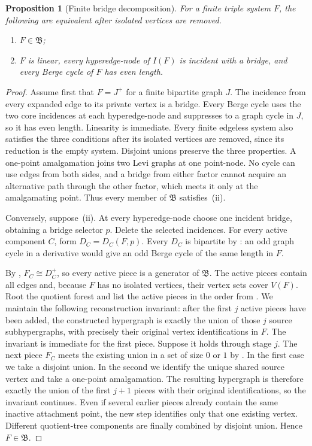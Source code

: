 \documentclass[11pt]{amsart}
\newtheorem{proposition}[proposition]{Proposition}
\theoremstyle{definition}
\theoremstyle{remark}
\numberwithin{equation}{section}
\newcommand{\Bclass}{\mathfrak B}
\begin{document}
\begin{proposition}[Finite bridge decomposition]
\label{prop:finite-decomposition}
For a finite triple system $F$, the following are equivalent after
isolated vertices are removed.
\begin{enumerate}[label=\textup{(\roman*)}]
\item $F\in\Bclass$;
\item $F$ is linear, every hyperedge-node of $I(F)$ is incident with a
bridge, and every Berge cycle of $F$ has even length.
\end{enumerate}
\end{proposition}

\begin{proof}
Assume first that $F=J^+$ for a finite bipartite graph $J$.  The
incidence from every expanded edge to its private vertex is a bridge.
Every Berge cycle uses the two core incidences at each hyperedge-node and
suppresses to a graph cycle in $J$, so it has even length.  Linearity is
immediate.  Every finite edgeless system also satisfies the three
conditions after its isolated vertices are removed, since its reduction
is the empty system.  Disjoint unions preserve the three properties.  A one-point
amalgamation joins two Levi graphs at one point-node.  No cycle can use
edges from both sides, and a bridge from either factor cannot acquire an
alternative path through the other factor, which meets it only at the
amalgamating point.  Thus every member of $\Bclass$ satisfies~\textup{(ii)}.

Conversely, suppose~\textup{(ii)}.  At every hyperedge-node choose one
incident bridge, obtaining a bridge selector $p$.  Delete the selected
incidences.  For every active component $C$, form
$D_C=D_C(F,p)$.  Every $D_C$ is bipartite by : an odd graph
cycle in a derivative would give an odd Berge cycle of the same length in
$F$.

By , $F_C\cong D_C^+$, so every active piece is
a generator of $\Bclass$.  The active pieces contain all edges and,
because $F$ has no isolated vertices, their vertex sets cover $V(F)$.
Root the quotient forest and list the active pieces in the order from
.  We maintain the following reconstruction
invariant: after the first $j$ active pieces have been added, the
constructed hypergraph is exactly the union of those $j$ source
subhypergraphs, with precisely their original vertex identifications in
$F$.  The invariant is immediate for the first piece.  Suppose it holds
through stage $j$.  The next piece $F_C$ meets the existing union in a set
of size $0$ or $1$ by .  In the first case we take a
disjoint union.  In the second we identify the unique shared source
vertex and take a one-point amalgamation.  The resulting hypergraph is
therefore exactly the union of the first $j+1$ pieces with their original
identifications, so the invariant continues.  Even if several earlier
pieces already contain the same inactive attachment point, the new step
identifies only that one existing vertex.  Different quotient-tree
components are finally combined by disjoint union.  Hence $F\in\Bclass$.
\end{proof}
\end{document}
